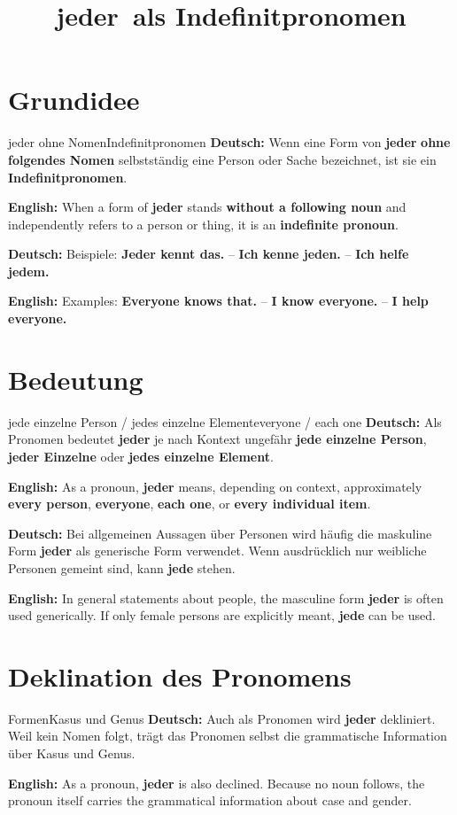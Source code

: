 \documentclass[a4paper,11pt]{article}
\title{\glqq jeder\grqq\ als Indefinitpronomen}
\date{}
\newcommand{\GermanText}[1]{\textbf{Deutsch: }#1\par}
\newcommand{\EnglishText}[1]{{\small\color{SoftGray}\textbf{English: }#1\par}}
\begin{document}
\maketitle
\tableofcontents
\newpage

\section{Grundidee}
\begin{grammarentry}{jeder ohne Nomen}{Indefinitpronomen}
\GermanText{Wenn eine Form von \textbf{jeder} \textbf{ohne folgendes Nomen} selbstständig eine Person oder Sache bezeichnet, ist sie ein \textbf{Indefinitpronomen}.}
\EnglishText{When a form of \textbf{jeder} stands \textbf{without a following noun} and independently refers to a person or thing, it is an \textbf{indefinite pronoun}.}
\GermanText{Beispiele: \textbf{Jeder kennt das.} -- \textbf{Ich kenne jeden.} -- \textbf{Ich helfe jedem.}}
\EnglishText{Examples: \textbf{Everyone knows that.} -- \textbf{I know everyone.} -- \textbf{I help everyone.}}
\end{grammarentry}

\section{Bedeutung}
\begin{grammarentry}{jede einzelne Person / jedes einzelne Element}{everyone / each one}
\GermanText{Als Pronomen bedeutet \textbf{jeder} je nach Kontext ungefähr \textbf{jede einzelne Person}, \textbf{jeder Einzelne} oder \textbf{jedes einzelne Element}.}
\EnglishText{As a pronoun, \textbf{jeder} means, depending on context, approximately \textbf{every person}, \textbf{everyone}, \textbf{each one}, or \textbf{every individual item}.}
\GermanText{Bei allgemeinen Aussagen über Personen wird häufig die maskuline Form \textbf{jeder} als generische Form verwendet. Wenn ausdrücklich nur weibliche Personen gemeint sind, kann \textbf{jede} stehen.}
\EnglishText{In general statements about people, the masculine form \textbf{jeder} is often used generically. If only female persons are explicitly meant, \textbf{jede} can be used.}
\end{grammarentry}

\section{Deklination des Pronomens}
\begin{grammarentry}{Formen}{Kasus und Genus}
\GermanText{Auch als Pronomen wird \textbf{jeder} dekliniert. Weil kein Nomen folgt, trägt das Pronomen selbst die grammatische Information über Kasus und Genus.}
\EnglishText{As a pronoun, \textbf{jeder} is also declined. Because no noun follows, the pronoun itself carries the grammatical information about case and gender.}
\end{grammarentry}
\end{document}
